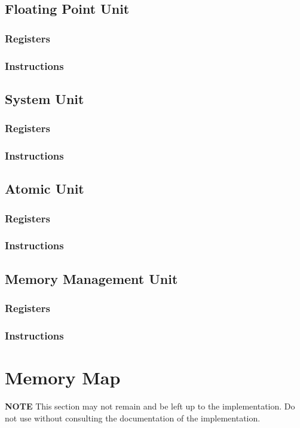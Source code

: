 \documentclass[letterpaper, 11pt]{article}
\begin{document}
\subsection{Floating Point Unit}
\subsubsection{Registers}
\subsubsection{Instructions}
\subsection{System Unit}
\subsubsection{Registers}
\subsubsection{Instructions}
\subsection{Atomic Unit}
\subsubsection{Registers}
\subsubsection{Instructions}
\subsection{Memory Management Unit}
\subsubsection{Registers}
\subsubsection{Instructions}

\section{Memory Map}
\textbf{NOTE}
This section may not remain and be left up to the implementation. Do not use without consulting
the documentation of the implementation.
\end{document}
